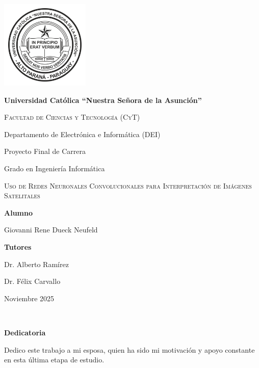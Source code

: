 \documentclass[a4paper, 11pt, twoside]{article}
\begin{document}
\begin{titlepage}
    \centering
    \includegraphics[width=160px]{img/logo-uca.png}\par
    {\bfseries\LARGE Universidad Católica \enquote{Nuestra Señora de la Asunción} \par}
    \vspace{1cm}
    {\scshape\Large Facultad de Ciencias y Tecnología (CyT)\par
    Departamento de Electrónica e Informática (DEI)\par}
    \vspace{1cm}
    {\Large Proyecto Final de Carrera \par
    Grado en Ingeniería Informática \par}
    \vspace{3cm}
    {\scshape\LARGE Uso de Redes Neuronales Convolucionales para Interpretación de Imágenes Satelitales \par}
    \vfill
    \begin{multicols}{2}
        \raggedright
        {\bf\Large Alumno\par}
        {\Large Giovanni Rene Dueck Neufeld\par}
        \newcolumn
        \raggedleft
        {\bf\Large Tutores\par}
        {\Large Dr. Alberto Ramírez\par Dr. Félix Carvallo\par}
    \end{multicols}
    \vfill
    {\Large Noviembre 2025 \par}
\end{titlepage}


\newpage
\ %
\newpage


\begin{center}
    {\bf Dedicatoria}
\end{center}

Dedico este trabajo a mi esposa, quien ha sido mi motivación y apoyo constante en esta última etapa de estudio.
\end{document}
